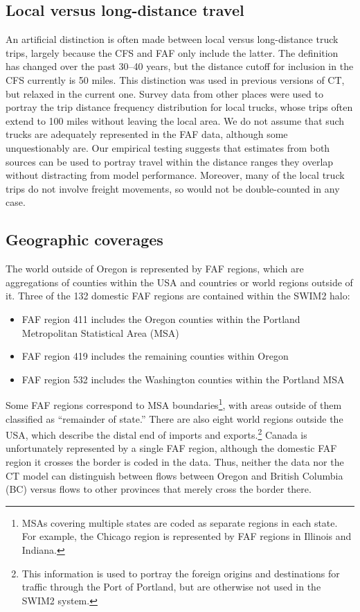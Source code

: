 \subsection{Local versus long-distance travel}

An artificial distinction is often made between local versus long-distance truck trips, largely because the CFS and FAF only include the latter. The definition has changed over the past 30--40 years, but the distance cutoff for inclusion in the CFS currently is 50 miles. This distinction was used in previous versions of CT, but relaxed in the current one. Survey data from other places were used to portray the trip distance frequency distribution for local trucks, whose trips often extend to 100 miles without leaving the local area. We do not assume that such trucks are adequately represented in the FAF data, although some unquestionably are. Our empirical testing suggests that estimates from both sources can be used to portray travel within the distance ranges they overlap without distracting from model performance. Moreover, many of the local truck trips do not involve freight movements, so would not be double-counted in any case.

\subsection{Geographic coverages}\label{sec:ct-geographic-coverages}

The world outside of Oregon is represented by FAF regions, which are aggregations of counties within the USA and countries or world regions outside of it. Three of the 132 domestic FAF regions are contained within the SWIM2 halo:
\begin{itemize}
    \item FAF region 411 includes the Oregon counties within the Portland Metropolitan Statistical Area (MSA)
    \item FAF region 419 includes the remaining counties within Oregon
    \item FAF region 532 includes the Washington counties within the Portland MSA
\end{itemize}

Some FAF regions correspond to MSA boundaries\footnote{MSAs covering multiple states are coded as separate regions in each state. For example, the Chicago region is represented by FAF regions in Illinois and Indiana.}, with areas outside of them classified as ``remainder of state.'' There are also eight world regions outside the USA, which describe the distal end of imports and exports.\footnote{This information is used to portray the foreign origins and destinations for traffic through the Port of Portland, but are otherwise not used in the SWIM2 system.} Canada is unfortunately represented by a single FAF region, although the domestic FAF region it crosses the border is coded in the data. Thus, neither the data nor the CT model can distinguish between flows between Oregon and British Columbia (BC) versus flows to other provinces that merely cross the border there.


